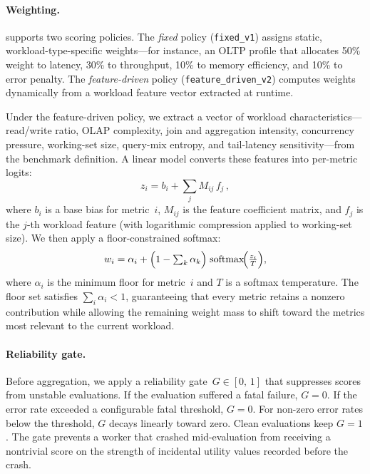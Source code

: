 \paragraph{Weighting.}
\sysname supports two scoring policies.  The \emph{fixed} policy
(\texttt{fixed\_v1}) assigns static, workload-type-specific weights---for
instance, an OLTP profile that allocates 50\% weight to latency, 30\% to
throughput, 10\% to memory efficiency, and 10\% to error
penalty.  The \emph{feature-driven} policy
(\texttt{feature\_driven\_v2}) computes weights dynamically from a workload
feature vector extracted at runtime.

Under the feature-driven policy, we extract a vector of workload
characteristics---read/write ratio, OLAP complexity, join and aggregation
intensity, concurrency pressure, working-set size, query-mix entropy, and
tail-latency sensitivity---from the benchmark definition.  A linear model
converts these features into per-metric logits:
\begin{equation}
  z_i = b_i + \sum_{j} M_{ij}\, f_j\,,
  \label{eq:logits}
\end{equation}
where $b_i$ is a base bias for metric~$i$, $M_{ij}$ is the feature
coefficient matrix, and $f_j$ is the $j$-th workload feature (with
logarithmic compression applied to working-set size).  We then apply a
floor-constrained softmax:
\begin{equation}
  w_i = \alpha_i + \Bigl(1 - \textstyle\sum_k \alpha_k\Bigr)\;
    \mathrm{softmax}\!\Bigl(\frac{z_i}{T}\Bigr),
  \label{eq:weights}
\end{equation}
where $\alpha_i$ is the minimum floor for metric~$i$ and $T$ is a softmax
temperature.  The floor set satisfies $\sum_i \alpha_i < 1$, guaranteeing
that every metric retains a nonzero contribution while allowing the remaining
weight mass to shift toward the metrics most relevant to the current workload.

\paragraph{Reliability gate.}
Before aggregation, we apply a reliability gate~$G \in [0,\,1]$ that
suppresses scores from unstable evaluations.  If the evaluation suffered a
fatal failure, $G = 0$.  If the error rate exceeded a configurable fatal
threshold, $G = 0$.  For non-zero error rates below the threshold, $G$ decays
linearly toward zero.  Clean evaluations keep $G = 1$.  The gate prevents a
worker that crashed mid-evaluation from receiving a nontrivial score on the
strength of incidental utility values recorded before the crash.

